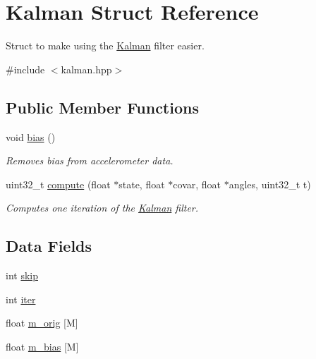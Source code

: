 \hypertarget{structKalman}{}\section{Kalman Struct Reference}
\label{structKalman}


Struct to make using the \hyperlink{structKalman}{Kalman} filter easier.  




{\ttfamily \#include $<$kalman.\+hpp$>$}

\subsection*{Public Member Functions}
\begin{DoxyCompactItemize}
\item 
\mbox{\label{structKalman_a92d8a2bf6c725e8ad7da1015bbc41cdc}} 
void \hyperlink{structKalman_a92d8a2bf6c725e8ad7da1015bbc41cdc}{bias} ()
\begin{DoxyCompactList}\small\item\em Removes bias from accelerometer data. \end{DoxyCompactList}\item 
uint32\+\_\+t \hyperlink{structKalman_ab314838fbb97199c19cd0fb48fffcfc4}{compute} (float $\ast$state, float $\ast$covar, float $\ast$angles, uint32\+\_\+t t)
\begin{DoxyCompactList}\small\item\em Computes one iteration of the \hyperlink{structKalman}{Kalman} filter. \end{DoxyCompactList}\end{DoxyCompactItemize}
\subsection*{Data Fields}
\textbf{ }\par
\begin{DoxyCompactItemize}
\item 
int \hyperlink{structKalman_a79ded01709506f54e5e2ef5d0b1c5ddf}{skip}
\item 
int \hyperlink{structKalman_a98fa8a7387b5714f1f5d9d85a2555411}{iter}
\item 
float \hyperlink{structKalman_a1672e563d4e6cc8f23b3fb4d1c546fe8}{m\+\_\+orig} \mbox{[}M\mbox{]}
\item 
float \hyperlink{structKalman_ace399cd36d8df2e905562b5d0952d11f}{m\+\_\+bias} \mbox{[}M\mbox{]}
\end{DoxyCompactItemize}



